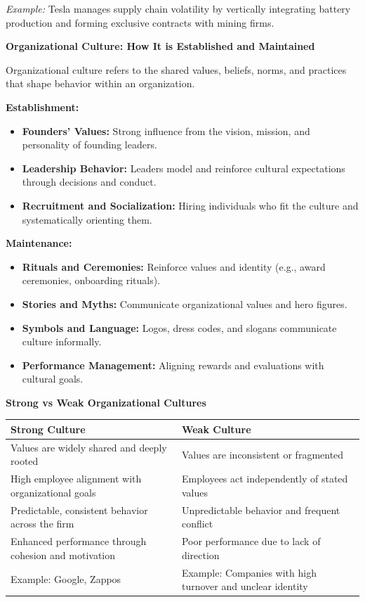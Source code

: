 \documentclass[10pt,a4paper]{book}
\begin{document}
\textit{Example:} Tesla manages supply chain volatility by vertically integrating battery production and forming exclusive contracts with mining firms.

\vspace{0.5cm}

\textbf{Organizational Culture: How It is Established and Maintained}

Organizational culture refers to the shared values, beliefs, norms, and practices that shape behavior within an organization.

\textbf{Establishment:}
\begin{itemize}
    \item \textbf{Founders’ Values:} Strong influence from the vision, mission, and personality of founding leaders.
    \item \textbf{Leadership Behavior:} Leaders model and reinforce cultural expectations through decisions and conduct.
    \item \textbf{Recruitment and Socialization:} Hiring individuals who fit the culture and systematically orienting them.
\end{itemize}

\textbf{Maintenance:}
\begin{itemize}
    \item \textbf{Rituals and Ceremonies:} Reinforce values and identity (e.g., award ceremonies, onboarding rituals).
    \item \textbf{Stories and Myths:} Communicate organizational values and hero figures.
    \item \textbf{Symbols and Language:} Logos, dress codes, and slogans communicate culture informally.
    \item \textbf{Performance Management:} Aligning rewards and evaluations with cultural goals.
\end{itemize}

\vspace{0.5cm}

\textbf{Strong vs Weak Organizational Cultures}

\begin{center}
\begin{tabular}{|p{8cm}|p{8cm}|}
\hline
\textbf{Strong Culture} & \textbf{Weak Culture} \\
\hline
Values are widely shared and deeply rooted & Values are inconsistent or fragmented \\
\hline
High employee alignment with organizational goals & Employees act independently of stated values \\
\hline
Predictable, consistent behavior across the firm & Unpredictable behavior and frequent conflict \\
\hline
Enhanced performance through cohesion and motivation & Poor performance due to lack of direction \\
\hline
Example: Google, Zappos & Example: Companies with high turnover and unclear identity \\
\hline
\end{tabular}
\end{center}
\end{document}
